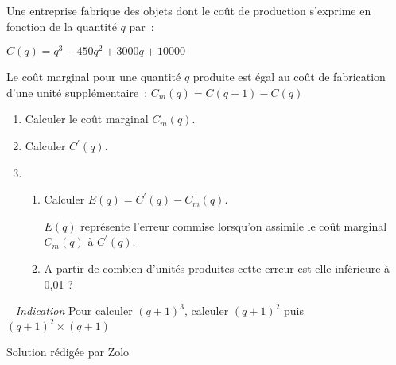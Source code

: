 
%
Une entreprise fabrique des objets dont le coût de production s'exprime en fonction de la quantité $q$ par~:
\par
$C\left(q\right)=q^{3}-450q^{2}+3000q+10000$
\par
Le coût marginal pour une quantité $q$ produite est égal au coût de fabrication d'une unité supplémentaire~: $C_{m}\left(q\right)=C\left(q+1\right)-C\left(q\right)$
\begin{enumerate}
     \item
     Calculer le coût marginal $C_{m}\left(q\right)$.
     \item
     Calculer $C^{\prime}\left(q\right)$.
     \item
     \begin{enumerate}[label=\alph*.]
          \item
          Calculer $E\left(q\right)=C^{\prime}\left(q\right)-C_{m}\left(q\right)$.
          \par
          $E\left(q\right)$ représente l'erreur commise lorsqu'on assimile le coût marginal $C_{m}\left(q\right)$ à $C^{\prime}\left(q\right)$.
          \item
          A partir de combien d'unités produites cette erreur est-elle inférieure à 0,01 ?
     \end{enumerate}
\end{enumerate}
~
\textit{Indication}
Pour calculer $\left(q+1\right)^{3}$, calculer $\left(q+1\right)^{2}$ puis $\left(q+1\right)^{2}\times \left(q+1\right)$
\begin{corrige}
     Solution rédigée par Zolo
     \par
     [pdf-embedder url="/wp-content/uploads/slides/cout-marginal/cout-marginal.pdf" width="676"]
\end{corrige}
